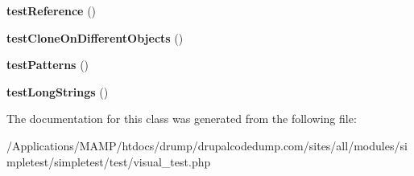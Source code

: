 \begin{DoxyCompactItemize}
\item 
\hypertarget{class_passing_unit_test_case_output_adda026e785c60a55bc58ca8fb5bb8265}{
{\bfseries testReference} ()}
\label{class_passing_unit_test_case_output_adda026e785c60a55bc58ca8fb5bb8265}

\item 
\hypertarget{class_passing_unit_test_case_output_a7b997d8b15db53a4f848aa20822d926e}{
{\bfseries testCloneOnDifferentObjects} ()}
\label{class_passing_unit_test_case_output_a7b997d8b15db53a4f848aa20822d926e}

\item 
\hypertarget{class_passing_unit_test_case_output_ac1a6ad196361c27a9b10063a415a8118}{
{\bfseries testPatterns} ()}
\label{class_passing_unit_test_case_output_ac1a6ad196361c27a9b10063a415a8118}

\item 
\hypertarget{class_passing_unit_test_case_output_a7bed31312611cd4e06a5affd188084e4}{
{\bfseries testLongStrings} ()}
\label{class_passing_unit_test_case_output_a7bed31312611cd4e06a5affd188084e4}

\end{DoxyCompactItemize}


The documentation for this class was generated from the following file:\begin{DoxyCompactItemize}
\item 
/Applications/MAMP/htdocs/drump/drupalcodedump.com/sites/all/modules/simpletest/simpletest/test/visual\_\-test.php\end{DoxyCompactItemize}
